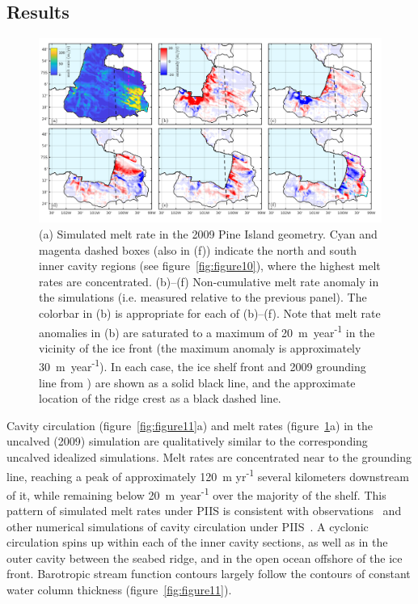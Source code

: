 \documentclass[draft]{agujournal2019}
\begin{document}
\subsection{Results}

\begin{figure}
    \centering
    \includegraphics[width = \textwidth]{../make_figures/plots/figure12.pdf}
    \caption{(a) Simulated melt rate in the 2009 Pine Island geometry. Cyan and magenta dashed boxes (also in (f)) indicate the north and south inner cavity regions (see figure~\ref{fig:figure10}), where the highest melt rates are concentrated. (b)--(f) Non-cumulative melt rate anomaly in the simulations (i.e. measured relative to the previous panel). The colorbar in (b) is appropriate for each of (b)--(f). Note that melt rate anomalies in (b) are saturated to a maximum of 20~m~year\textsuperscript{-1} in the vicinity of the ice front (the maximum anomaly is approximately 30~m~year\textsuperscript{-1}). In each case, the ice shelf front and 2009 grounding line from \cite{Joughin2010GRL}) are shown as a solid black line, and the approximate location of the ridge crest as a black dashed line.} 
    \label{fig:figure12}
\end{figure}


Cavity circulation (figure~\ref{fig:figure11}a) and melt rates (figure~\ref{fig:figure12}a) in the uncalved (2009) simulation are qualitatively similar to the corresponding uncalved idealized simulations. Melt rates are concentrated near to the grounding line, reaching a peak of approximately 120~m yr\textsuperscript{-1} several kilometers downstream of it, while remaining below 20~m~year\textsuperscript{-1} over the majority of the shelf. This pattern of simulated melt rates under PIIS is consistent with observations~\cite{Dutrieux2013Cryosphere} and other numerical simulations of cavity circulation under PIIS~\cite{Heimbach2012AnnGlac}. A cyclonic circulation spins up within each of the inner cavity sections, as well as in the outer cavity between the seabed ridge, and in the open ocean offshore of the ice front. Barotropic stream function contours largely follow the contours of constant water column thickness (figure~\ref{fig:figure11}).
\end{document}
